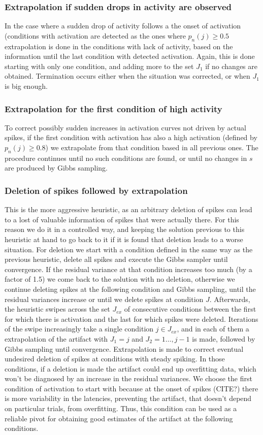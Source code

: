 \documentclass[12pt,letterpaper,fleqn]{article}
\begin{document}
\subsubsection{Extrapolation if sudden drops in activity are observed}
In the case where a sudden drop of activity follows a the onset of activation (conditions with activation are detected as the ones where $p_n(j)\geq 0.5$ extrapolation is done in the conditions with lack of activity, based on the information until the last condition with detected activation. Again, this is done starting with only one condition, and adding more to the set $J_1$ if no changes are obtained. Termination occurs either when the situation was corrected, or when $J_1$ is big enough.
\subsubsection{Extrapolation for the first condition of high activity}
To correct possibly sudden increases in activation curves not driven by actual spikes, if the first condition with activation has also a high activation (defined by $p_n(j)\geq 0.8$) we extrapolate from that condition based in all previous ones. The procedure continues until no such conditions are found, or until no changes in $s$ are produced by Gibbs sampling.
\subsubsection{Deletion of spikes followed by extrapolation}
This is the more aggressive heuristic, as an arbitrary deletion of spikes can lead to a lost of valuable information of spikes that were actually there. For this reason we do it in a controlled way, and keeping the solution previous to this heuristic at hand to go back to it if it is found that deletion leads to a worse situation. For deletion we start with a condition defined in the same way as the previous heuristic, delete all spikes and execute the Gibbs sampler until convergence. If the residual variance at that condition increases too much (by a factor of 1.5) we come back to the solution with no deletion, otherwise we continue deleting spikes at the following condition and Gibbs sampling, until the residual variances increase or until we delete spikes at condition $J$. Afterwards, the heuristic swipes across the set $J_{ex}$ of consecutive conditions between the first for which there is activation and the last for which spikes were deleted. Iterations of the swipe increasingly take a single condition $j\in J_{ex}$, and in each of them a extrapolation of the artifact with $J_1={j}$ and $J_2={1\ldots ,j-1}$ is made, followed by Gibbs sampling until convergence. Extrapolation is made to correct eventual undesired deletion of spikes at conditions with steady spiking. In those conditions, if a deletion is made the artifact could end up overfitting data, which won't be diagnosed by an increase in the residual variances. We choose the first condition of activation to start with because at the onset of spikes (CITE?) there is more variability in the latencies, preventing the artifact, that doesn't depend on particular trials, from overfitting. Thus, this condition can be used as a reliable pivot for obtaining good estimates of the artifact at the following conditions. 
\end{document}

